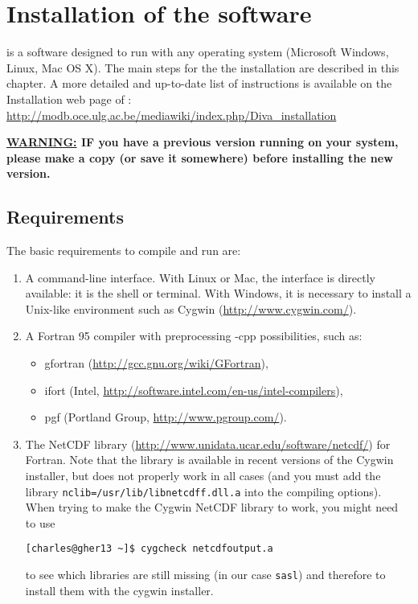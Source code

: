 \chapter{Installation of the software\label{chap:installation}}

\diva is a software designed to run with any operating system (Microsoft Windows, Linux, Mac OS X). The main steps for the the installation are described in this chapter. A more detailed and up-to-date list of instructions is available on the Installation web page of \diva: \url{http://modb.oce.ulg.ac.be/mediawiki/index.php/Diva_installation}

{\bf \underline{WARNING:} IF you have a previous \diva version  running on your system, please make a copy (or save it somewhere) before installing the new version.} 


\minitoc




\section{Requirements}

The basic requirements to compile and run \diva are:
\begin{enumerate}
\item A command-line interface. With Linux or Mac, the interface is directly available: it is the shell or terminal. With Windows, it is necessary to install a Unix-like environment such as Cygwin (\url{http://www.cygwin.com/}).
\item A Fortran 95 compiler with preprocessing -cpp possibilities, such as:
\begin{itemize}
\item gfortran (\url{http://gcc.gnu.org/wiki/GFortran}),
\item ifort (Intel\textsuperscript{\textregistered}, \url{http://software.intel.com/en-us/intel-compilers}),
\item pgf (Portland Group, \url{http://www.pgroup.com/}).
\end{itemize}    
\item The NetCDF library (\url{http://www.unidata.ucar.edu/software/netcdf/}) for Fortran. Note that the library is available in recent versions of the Cygwin installer, but does not properly work in all cases (and you must add the library \texttt{nclib=/usr/lib/libnetcdff.dll.a} into the compiling options). When trying to make the Cygwin NetCDF library to work, you might need to use 

\begin{lstlisting}[style=Bash]
[charles@gher13 ~]$ cygcheck netcdfoutput.a
\end{lstlisting}
to see which libraries are still missing (in our case \texttt{sasl}) and therefore to install them with the cygwin installer.  
\end{enumerate}

